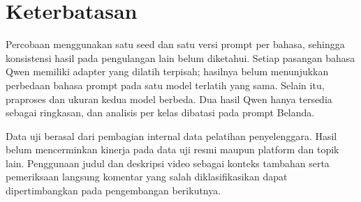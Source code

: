 \documentclass[11pt]{article}
\begin{document}
\section*{Keterbatasan}
Percobaan menggunakan satu seed dan satu versi prompt per bahasa, sehingga konsistensi hasil pada pengulangan lain belum diketahui. Setiap pasangan bahasa Qwen memiliki adapter yang dilatih terpisah; hasilnya belum menunjukkan perbedaan bahasa prompt pada satu model terlatih yang sama. Selain itu, praproses dan ukuran kedua model berbeda. Dua hasil Qwen hanya tersedia sebagai ringkasan, dan analisis per kelas dibatasi pada prompt Belanda.

Data uji berasal dari pembagian internal data pelatihan penyelenggara. Hasil belum mencerminkan kinerja pada data uji resmi maupun platform dan topik lain. Penggunaan judul dan deskripsi video sebagai konteks tambahan serta pemeriksaan langsung komentar yang salah diklasifikasikan dapat dipertimbangkan pada pengembangan berikutnya.


\end{document}
